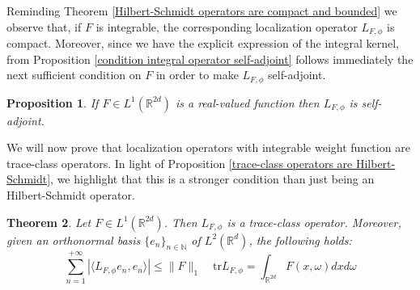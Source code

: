 \documentclass[corpo=11pt, stile=classica, tipotesi=custom,
greek, evenboxes, english]{toptesi}
\numberwithin{equation}{chapter}
\newtheorem{teo}{Theorem}[chapter] %
\newtheorem{prop}[teo]{Proposition}
\theoremstyle{remark}
\newcommand{\R}{\mathbb{R}} %
\newcommand{\N}{\mathbb{N}} %
\begin{document}
Reminding Theorem \ref{Hilbert-Schmidt operators are compact and bounded} we observe that, if $F$ is integrable, the corresponding localization operator $L_{F,\phi}$ is compact. Moreover, since we have the explicit expression of the integral kernel, from Proposition \ref{condition integral operator self-adjoint} follows immediately the next sufficient condition on $F$ in order to make $L_{F,\phi}$ self-adjoint.
\begin{prop}\label{condition localization operator self-adjoint}
	If $F \in L^1(\R^{2d})$ is a real-valued function then $L_{F,\phi}$ is self-adjoint.
\end{prop}
We will now prove that localization operators with integrable weight function are trace-class operators. In light of Proposition \ref{trace-class operators are Hilbert-Schmidt}, we highlight that this is a stronger condition than just being an Hilbert-Schmidt operator.
\begin{teo}\label{F integrable L_F trace-class}
	Let $F \in L^1(\R^{2d})$. Then $L_{F,\phi}$ is a trace-class operator. Moreover, given an orthonormal basis $\{e_n\}_{n \in \N}$ of $L^2(\R^d)$, the following holds:
	\begin{equation}\label{trace of localization operators}
		\sum_{n=1}^{+\infty} |\langle L_{F,\phi}e_n,e_n \rangle| \leq \|F\|_1 \quad \mathrm{tr}L_{F,\phi} = \int_{\R^{2d}} F(x,\omega) dx d\omega
	\end{equation}
\end{teo}
\end{document}
